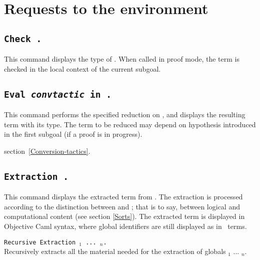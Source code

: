 \section{Requests to the environment}

\subsection{\tt Check {\term}.}
\label{Check}
This command displays the type of {\term}. When called in proof mode, 
the term is checked in the local context of the current subgoal.


\subsection{\tt Eval {\rm\sl convtactic} in {\term}.}

This command performs the specified reduction on {\term}, and displays
the resulting term with its type. The term to be reduced may depend on
hypothesis introduced in the first subgoal (if a proof is in
progress).


\SeeAlso section~\ref{Conversion-tactics}.

\subsection{\tt Extraction \term.}
\label{ExtractionTerm}
This command displays the extracted term from
{\term}. The extraction is processed according to the distinction
between {\Set} and {\Prop}; that is to say, between logical and
computational content (see section \ref{Sorts}). The extracted term is
displayed in Objective Caml syntax, where global identifiers are still
displayed as in \Coq\ terms.

\begin{Variants}
\item \texttt{Recursive Extraction {\qualid$_1$} ... {\qualid$_n$}.}\\
  Recursively extracts all the material needed for the extraction of 
  globals \qualid$_1$ ... \qualid$_n$.
\end{Variants}

